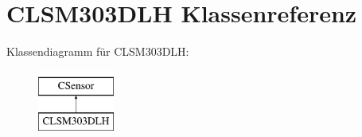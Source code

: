 \hypertarget{class_c_l_s_m303_d_l_h}{\section{\-C\-L\-S\-M303\-D\-L\-H \-Klassenreferenz}
\label{class_c_l_s_m303_d_l_h}
}
\-Klassendiagramm für \-C\-L\-S\-M303\-D\-L\-H\-:\begin{figure}[H]
\begin{center}
\leavevmode
\includegraphics[height=2.000000cm]{class_c_l_s_m303_d_l_h}
\end{center}
\end{figure}
